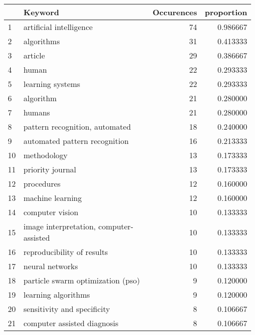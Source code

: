 \begin{tabular}{llrr}
\toprule
{} &                                  Keyword &  Occurences &  proportion \\
\midrule
1  &                  artificial intelligence &          74 &    0.986667 \\
2  &                               algorithms &          31 &    0.413333 \\
3  &                                  article &          29 &    0.386667 \\
4  &                                    human &          22 &    0.293333 \\
5  &                         learning systems &          22 &    0.293333 \\
6  &                                algorithm &          21 &    0.280000 \\
7  &                                   humans &          21 &    0.280000 \\
8  &           pattern recognition, automated &          18 &    0.240000 \\
9  &            automated pattern recognition &          16 &    0.213333 \\
10 &                              methodology &          13 &    0.173333 \\
11 &                         priority journal &          13 &    0.173333 \\
12 &                               procedures &          12 &    0.160000 \\
13 &                         machine learning &          12 &    0.160000 \\
14 &                          computer vision &          10 &    0.133333 \\
15 &  image interpretation, computer-assisted &          10 &    0.133333 \\
16 &               reproducibility of results &          10 &    0.133333 \\
17 &                          neural networks &          10 &    0.133333 \\
18 &        particle swarm optimization (pso) &           9 &    0.120000 \\
19 &                      learning algorithms &           9 &    0.120000 \\
20 &              sensitivity and specificity &           8 &    0.106667 \\
21 &              computer assisted diagnosis &           8 &    0.106667 \\

\end{tabular}
